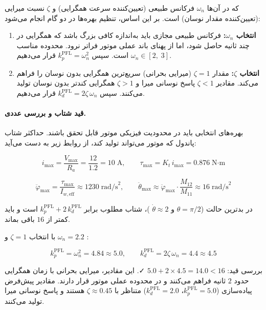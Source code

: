 که در آن‌ها $\omega_n$ فرکانس طبیعی (تعیین‌کننده سرعت همگرایی) و $\zeta$ نسبت میرایی (تعیین‌کننده مقدار نوسان) است. بر این اساس، تنظیم بهره‌ها در دو گام انجام می‌شود:

\begin{enumerate}
    \item \textbf{انتخاب $\omega_n$:} فرکانس طبیعی مجازی باید به‌اندازه کافی بزرگ باشد که همگرایی در چند ثانیه حاصل شود، اما از پهنای باند عملی موتور فراتر نرود. محدوده مناسب $\omega_n \in [2,\; 3]$  است. سپس $k_p^{\text{PFL}} = \omega_n^2$ قرار می‌دهیم.
    \item \textbf{انتخاب $\zeta$:} مقدار $\zeta = 1$ (میرایی بحرانی) سریع‌ترین همگرایی بدون نوسان را فراهم می‌کند. مقادیر $\zeta < 1$ پاسخ نوسانی میرا و $\zeta > 1$ همگرایی کندتر بدون نوسان تولید می‌کنند. سپس $k_d^{\text{PFL}} = 2\zeta\,\omega_n$ قرار می‌دهیم.
\end{enumerate}

\paragraph{قید شتاب و بررسی عددی.}
بهره‌های انتخابی باید در محدودیت فیزیکی موتور قابل تحقق باشند. حداکثر شتاب پاندول که موتور می‌تواند تولید کند، از روابط زیر به دست می‌آید:

\begin{equation}
    i_{\max} = \frac{V_{\max}}{R_a} = \frac{12}{1.2} = 10\;\text{A}, \qquad
    \tau_{\max} = K_t \, i_{\max} = 0.876\;\text{N·m}
\end{equation}

\begin{equation}
    \ddot\varphi_{\max} = \frac{\tau_{\max}}{I_{w,\text{eff}}} \approx 1230\;\text{rad/s}^2, \qquad
    \ddot\theta_{\max} \approx \ddot\varphi_{\max} \cdot \frac{M_{12}}{M_{11}} \approx 16\;\text{rad/s}^2
\end{equation}

در بدترین حالت ($\theta = \pi/2$ و $\dot\theta \approx 2$ )، شتاب مطلوب برابر $k_p^{\text{PFL}} + 2\,k_d^{\text{PFL}}$ است و باید کمتر از $16$  باقی بماند.

با انتخاب $\zeta = 1$ و $\omega_n = 2.2$ :

\begin{equation}
    k_p^{\text{PFL}} = \omega_n^2 = 4.84 \approx 5.0, \qquad
    k_d^{\text{PFL}} = 2\zeta\,\omega_n = 4.4 \approx 4.5
\end{equation}

بررسی قید: $5.0 + 2 \times 4.5 = 14.0 < 16$ ✓. این مقادیر، میرایی بحرانی با زمان همگرایی حدود $2$ ثانیه فراهم می‌کنند و در محدوده عملی موتور قرار دارند. مقادیر پیش‌فرض پیاده‌سازی ($k_p^{\text{PFL}} = 5.0$، $k_d^{\text{PFL}} = 2.0$) متناظر با $\zeta \approx 0.45$ هستند و پاسخ نوسانی میرا تولید می‌کنند.

